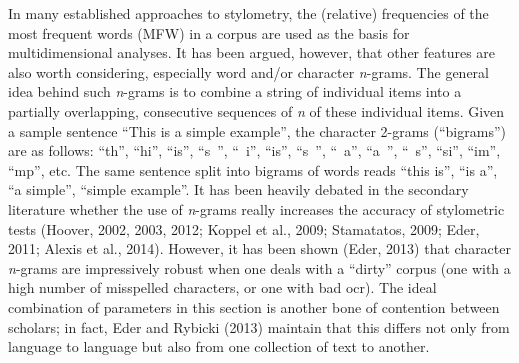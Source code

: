 \documentclass[11pt,a4paper]{article}
\begin{document}
In many established approaches to stylometry, the (relative) frequencies
of the most frequent words (MFW) in a corpus are used as the basis
for multidimensional analyses. It has been argued, however, that other
features are also worth considering, especially word and/or character
\emph{n}-grams. The general idea behind such \emph{n}-grams is to
combine a string of individual items into a partially overlapping,
consecutive sequences of \textit{n} of these individual items. Given a sample
sentence “This is a simple example”, the character 2-grams (``bigrams'')
are as follows: “th”, “hi”, “is”, “s~”, “~i”, “is”, “s~”, “~a”, “a~”, “~s”, 
“si”, “im”, “mp”, etc. The same sentence split into bigrams
of words reads “this is”, “is a”, “a simple”, “simple example”. It
has been heavily debated in the secondary literature whether the use
of \emph{n}-grams really increases the accuracy of stylometric tests
(Hoover, 2002, 2003, 2012; Koppel et al., 2009; Stamatatos, 2009;
Eder, 2011; Alexis et al., 2014). However, it has been shown (Eder,
2013) that character \emph{n}-grams are impressively robust when one
deals with a ``dirty'' corpus (one with a high number of misspelled
characters, or one with bad {\sc ocr}). The ideal combination of parameters
in this section is another bone of contention between scholars; in
fact, Eder and Rybicki (2013) maintain that this differs not only
from language to language but also from one collection of text to
another.
\end{document}
